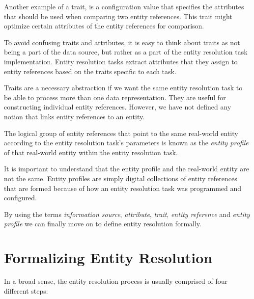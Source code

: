 \documentclass[journal]{IEEEtran}
\begin{document}
    Another example of a trait, is a configuration value that specifies the
    attributes that should be used when comparing two entity references.
    This trait might optimize certain attributes of the entity references for
    comparison.
    
    To avoid confusing traits and attributes, it is easy to think about traits
    as not being a part of the data source, but rather as a part of the entity
    resolution task implementation.
    Entity resolution tasks extract attributes that they assign to entity
    references based on the traits specific to each task.

    Traits are a necessary abstraction if we want the same entity resolution
    task to be able to process more than one data representation.
    They are useful for constructing individual entity references.
    However, we have not defined any notion that links entity references to an
    entity.
    
    \begin{defn}
        The logical group of entity references that point to the same real-world
        entity according to the entity resolution task's parameters is known as
        the \textit{entity profile} of that real-world entity within the entity
        resolution task.
    \end{defn}

    It is important to understand that the entity profile and the real-world
    entity are not the same.
    Entity profiles are simply digital collections of entity references that are
    formed because of how an entity resolution task was programmed and
    configured.
    
    By using the terms \textit{information source}, \textit{attribute},
    \textit{trait}, \textit{entity reference} and \textit{entity profile} we can
    finally move on to define entity resolution formally.

    \section{Formalizing Entity Resolution}\label{sec:entity-resolution}

    In a broad sense, the entity resolution process is usually comprised of four
    different steps\cite{Pap19,Tal11}:
\end{document}
